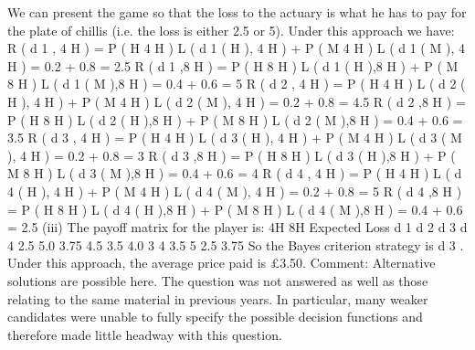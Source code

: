\documentclass[a4paper,12pt]{article}
\begin{document}
We can present the game so that the loss to the actuary is what he has to pay
for the plate of chillis (i.e. the loss is either 2.5 or 5). Under this approach we
have:
R ( d 1 , 4 H ) = P ( H 4 H ) \times L ( d 1 ( H ), 4 H ) + P ( M 4 H ) \times L ( d 1 ( M ), 4 H ) = 0.2  + 0.8  = 2.5
R ( d 1 ,8 H ) = P ( H 8 H ) \times L ( d 1 ( H ),8 H ) + P ( M 8 H ) \times L ( d 1 ( M ),8 H ) = 0.4  + 0.6  = 5
R ( d 2 , 4 H ) = P ( H 4 H ) \times L ( d 2 ( H ), 4 H ) + P ( M 4 H ) \times L ( d 2 ( M ), 4 H ) = 0.2  + 0.8  = 4.5
R ( d 2 ,8 H ) = P ( H 8 H ) \times L ( d 2 ( H ),8 H ) + P ( M 8 H ) \times L ( d 2 ( M ),8 H ) = 0.4  + 0.6  = 3.5
R ( d 3 , 4 H ) = P ( H 4 H ) \times L ( d 3 ( H ), 4 H ) + P ( M 4 H ) \times L ( d 3 ( M ), 4 H ) = 0.2  + 0.8  = 3
R ( d 3 ,8 H ) = P ( H 8 H ) \times L ( d 3 ( H ),8 H ) + P ( M 8 H ) \times L ( d 3 ( M ),8 H ) = 0.4  + 0.6  = 4
R ( d 4 , 4 H ) = P ( H 4 H ) \times L ( d 4 ( H ), 4 H ) + P ( M 4 H ) \times L ( d 4 ( M ), 4 H ) = 0.2  + 0.8  = 5
R ( d 4 ,8 H ) = P ( H 8 H ) \times L ( d 4 ( H ),8 H ) + P ( M 8 H ) \times L ( d 4 ( M ),8 H ) = 0.4  + 0.6  = 2.5
(iii)
The payoff matrix for the player is:
4H
8H
Expected Loss
d 1 d 2 d 3 d 4
2.5
5.0
3.75 4.5
3.5
4.0 3
4
3.5 5
2.5
3.75
So the Bayes criterion strategy is d 3 .
Under this approach, the average price paid is £3.50.
Comment: Alternative solutions are possible here. The question was not answered as well as
those relating to the same material in previous years. In particular, many weaker candidates
were unable to fully specify the possible decision functions and therefore made little headway
with this question.
\end{document}
